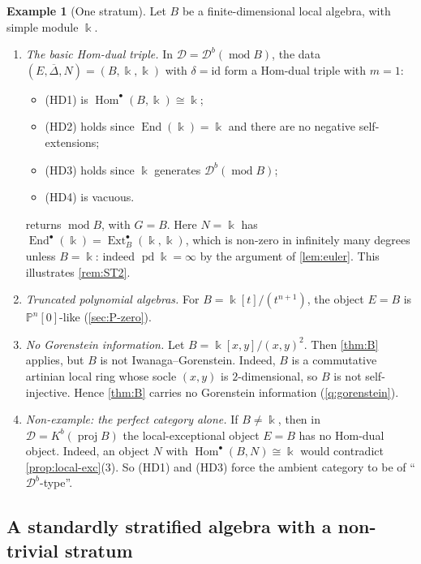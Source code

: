 \documentclass[11pt,reqno]{amsart}
\theoremstyle{plain}
\theoremstyle{definition}
\newtheorem{example}[theorem]{Example}
\theoremstyle{remark}
\newcommand{\kk}{\Bbbk}
\DeclareMathOperator{\Hom}{Hom}
\DeclareMathOperator{\End}{End}
\DeclareMathOperator{\Ext}{Ext}
\DeclareMathOperator{\pd}{pd}
\newcommand{\modd}{\operatorname{mod}}
\newcommand{\proj}{\operatorname{proj}}
\newcommand{\Db}{\mathcal{D}^b}
\newcommand{\Kb}{K^b}
\newcommand{\Pn}[2]{\mathbb{P}^{#1}[#2]}
\newcommand{\Deltabar}{\overline{\Delta}}
\newcommand{\cD}{\mathcal{D}}
\begin{document}
\begin{example}[One stratum]\label{ex:local-alg}
Let $B$ be a finite-dimensional local algebra, with simple module $\kk$.
\begin{enumerate}
\item \emph{The basic Hom-dual triple.} In $\cD=\Db(\modd B)$, the data $(E,\Deltabar,N)=(B,\kk,\kk)$ with $\delta=\mathrm{id}$ form a Hom-dual triple with $m=1$:
\begin{itemize}
\item (HD1) is $\Hom^\bullet(B,\kk)\cong\kk$;
\item (HD2) holds since $\End(\kk)=\kk$ and there are no negative self-extensions;
\item (HD3) holds since $\kk$ generates $\Db(\modd B)$;
\item (HD4) is vacuous.
\end{itemize}
 returns $\modd B$, with $G=B$. Here $N=\kk$ has $\End^\bullet(\kk)=\Ext^\bullet_B(\kk,\kk)$, which is non-zero in infinitely many degrees unless $B=\kk$: indeed $\pd\kk=\infty$ by the argument of \cref{lem:euler}. This illustrates \cref{rem:ST2}.
\item \emph{Truncated polynomial algebras.} For $B=\kk[t]/(t^{n+1})$, the object $E=B$ is $\Pn n0$-like (\cref{sec:P-zero}).
\item \emph{No Gorenstein information.} Let $B=\kk[x,y]/(x,y)^2$. Then \cref{thm:B} applies, but $B$ is not Iwanaga--Gorenstein. Indeed, $B$ is a commutative artinian local ring whose socle $(x,y)$ is $2$-dimensional, so $B$ is not self-injective. Hence \cref{thm:B} carries no Gorenstein information (\cref{q:gorenstein}).
\item \emph{Non-example: the perfect category alone.} If $B\ne\kk$, then in $\cD=\Kb(\proj B)$ the local-exceptional object $E=B$ has no Hom-dual object. Indeed, an object $N$ with $\Hom^\bullet(B,N)\cong\kk$ would contradict \cref{prop:local-exc}(3). So (HD1) and (HD3) force the ambient category to be of ``$\Db$-type''.
\end{enumerate}
\end{example}

\subsection{A standardly stratified algebra with a non-trivial stratum}
\end{document}

